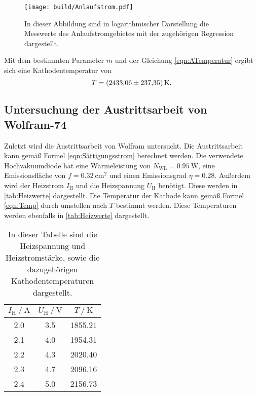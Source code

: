 \begin{figure}
  \centering
  \texttt{[image: build/Anlaufstrom.pdf]}
  \caption{In dieser Abbildung sind in logarithmischer Darstellung die Messwerte des Anlaufstromgebietes mit der zugehörigen Regression dargestellt.}
  \label{fig:Anlaufstrom}
\end{figure}

Mit dem bestimmten Parameter $m$ und der Gleichung \eqref{eqn:ATemperatur} ergibt sich eine Kathodentemperatur von 
\begin{equation*}
  T = \qty{2433.06 +- 237.35}{\kelvin}.
\end{equation*}

\subsection{Untersuchung der Austrittsarbeit von Wolfram-74}
\label{subsec:Austrittsarbeit}
Zuletzt wird die Austrittsarbeit von Wolfram untersucht. Die Austrittsarbeit kann gemäß Formel \eqref{eqn:Sättigungsstrom} berechnet werden. Die verwendete
Hochvakuumdiode hat eine Wärmeleistung von $N_\text{WL} = \qty{0.95}{\watt}$, eine Emissionsfläche von $f = \qty{0.32}{\centi\metre\squared}$ und einen Emissionsgrad
$\eta = \num{0.28}$. Außerdem wird der Heizstrom $I_\text{H}$ und die Heizspannung $U_\text{H}$ benötigt. Diese werden in \autoref{tab:Heizwerte} dargestellt.
Die Temperatur der Kathode kann gemäß Formel \eqref{eqn:Temp} durch umstellen nach $T$ bestimmt werden. Diese Temperaturen werden ebenfalls in \autoref{tab:Heizwerte} 
dargestellt.

\begin{table}
  \centering
  \caption{In dieser Tabelle sind die Heizspannung und Heizstromstärke, sowie die dazugehörigen Kathodentemperaturen dargestellt.}
  \label{tab:Heizwerte}
  \begin{tabular}{S[table-format = 1.1] S S[table-format = 4.2]}
    \toprule
      {$I_\text{H} \mathbin{/} \unit{\ampere}$} & {$U_\text{H} \mathbin{/} \unit{\volt}$} & {$T \mathbin{/} \unit{\kelvin}$} \\
       & 3.5 & 1855.21 \\
      2.1 & 4.0 & 1954.31 \\
      2.2 & 4.3 & 2020.40 \\
      2.3 & 4.7 & 2096.16 \\
      2.4 & 5.0 & 2156.73 \\
    \bottomrule
  \end{tabular}
\end{table}


